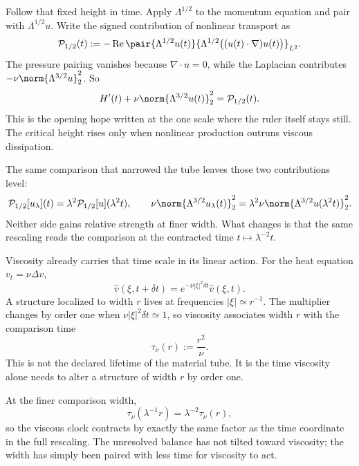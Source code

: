 
Follow that fixed height in time. Apply \(\Lambda^{1/2}\) to the momentum equation and pair with \(\Lambda^{1/2}u\). Write the signed contribution of nonlinear transport as
\[
  \mathcal P_{1/2}(t)
  :=
  -\operatorname{Re}
  \pair
    {\Lambda^{1/2}u(t)}
    {\Lambda^{1/2}\bigl((u(t)\cdot\nabla)u(t)\bigr)}_{L^2}.
\]
The pressure pairing vanishes because \(\nabla\cdot u=0\), while the Laplacian contributes \(-\nu\norm{\Lambda^{3/2}u}_2^2\). So
\[
  H'(t)
  +
  \nu\norm{\Lambda^{3/2}u(t)}_2^2
  =
  \mathcal P_{1/2}(t).
\]
This is the opening hope written at the one scale where the ruler itself stays still. The critical height rises only when nonlinear production outruns viscous dissipation.

The same comparison that narrowed the tube leaves those two contributions level:
\[
  \mathcal P_{1/2}[u_\lambda](t)
  =
  \lambda^2\mathcal P_{1/2}[u](\lambda^2t),
  \qquad
  \nu\norm{\Lambda^{3/2}u_\lambda(t)}_2^2
  =
  \lambda^2\nu\norm{\Lambda^{3/2}u(\lambda^2t)}_2^2.
\]
Neither side gains relative strength at finer width. What changes is that the same rescaling reads the comparison at the contracted time \(t\mapsto\lambda^{-2}t\).


Viscosity already carries that time scale in its linear action. For the heat equation \(v_t=\nu\Delta v\),
\[
  \widehat v(\xi,t+\delta t)
  =
  e^{-\nu|\xi|^2\delta t}\widehat v(\xi,t).
\]
A structure localized to width \(r\) lives at frequencies \(|\xi|\simeq r^{-1}\). The multiplier changes by order one when \(\nu|\xi|^2\delta t\simeq1\), so viscosity associates width \(r\) with the comparison time
\[
  \tau_\nu(r)
  :=
  \frac{r^2}{\nu}.
\]
This is not the declared lifetime of the material tube. It is the time viscosity alone needs to alter a structure of width \(r\) by order one.

At the finer comparison width,
\[
  \tau_\nu(\lambda^{-1}r)
  =
  \lambda^{-2}\tau_\nu(r),
\]
so the viscous clock contracts by exactly the same factor as the time coordinate in the full \NavierStokes{} rescaling. The unresolved balance has not tilted toward viscosity; the width has simply been paired with less time for viscosity to act.


